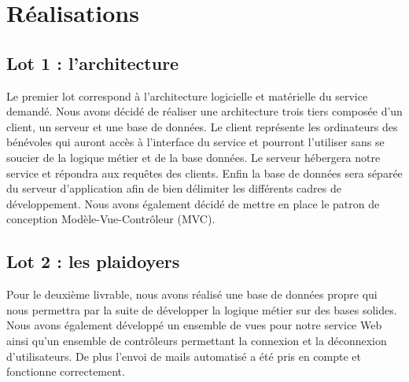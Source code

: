 \documentclass[asi]{picInsa}
\begin{document}
\section{Réalisations}
\subsection{Lot 1 : l'architecture}
Le premier lot correspond à l'architecture logicielle et matérielle du service demandé. Nous avons décidé de réaliser une architecture trois tiers composée d'un client, un serveur et une base de données. Le client représente les ordinateurs des bénévoles qui auront accès à l'interface du service et pourront l'utiliser sans se soucier de la logique métier et de la base données. Le serveur hébergera notre service et répondra aux requêtes des clients. Enfin la base de données sera séparée du serveur d'application afin de bien délimiter les différents cadres de développement. Nous avons également décidé de mettre en place le patron de conception Modèle-Vue-Contrôleur (MVC).\\

\subsection{Lot 2 : les plaidoyers}
Pour le deuxième livrable, nous avons réalisé une base de données propre qui nous permettra par la suite de développer la logique métier sur des bases solides. Nous avons également développé un ensemble de vues pour notre service Web ainsi qu'un ensemble de contrôleurs permettant la connexion et la déconnexion  d'utilisateurs. De plus l'envoi de mails automatisé a été pris en compte et fonctionne correctement.


 
	 
\pageQuatriemeCouverture
\end{document}
